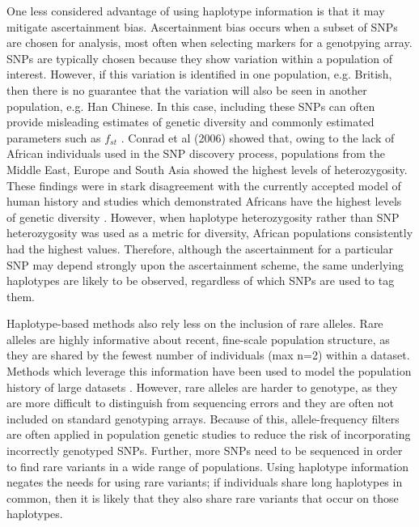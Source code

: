 One less considered advantage of using haplotype information is that it may mitigate ascertainment bias. Ascertainment bias occurs when a subset of SNPs are chosen for analysis, most often when selecting markers for a genotpying array. SNPs are typically chosen because they show variation within a population of interest. However, if this variation is identified in one population, e.g. British, then there is no guarantee that the variation will also be seen in another population, e.g. Han Chinese. In this case, including these SNPs can often provide misleading estimates of genetic diversity and commonly estimated parameters such as $f_{st}$ \cite{BergstromHGDP}. Conrad et al (2006) showed that, owing to the lack of African individuals used in the SNP discovery process, populations from the Middle East, Europe and South Asia showed the highest levels of heterozygosity. These findings were in stark disagreement with the currently accepted model of human history and studies which demonstrated Africans have the highest levels of genetic diversity \cite{cann1987mitochondrial, rosenberg2002genetic, ramachandran2005support, bowcock1994high, hellenthal2008inferring}. However, when haplotype heterozygosity rather than SNP heterozygosity was used as a metric for diversity, African populations consistently had the highest values. Therefore, although the ascertainment for a particular SNP may depend strongly upon the ascertainment scheme, the same underlying haplotypes are likely to be observed, regardless of which SNPs are used to tag them. 

Haplotype-based methods also rely less on the inclusion of rare alleles. Rare alleles are highly informative about recent, fine-scale population structure, as they are shared by the fewest number of individuals (max n=2) within a dataset. Methods which leverage this information have been used to model the population history of large datasets \cite{schiffels2016iron, gravel2011demographic, o2015rare}. However, rare alleles are harder to genotype, as they are more difficult to distinguish from sequencing errors and they are often not included on standard genotyping arrays. Because of this, allele-frequency filters are often applied in population genetic studies to reduce the risk of incorporating incorrectly genotyped SNPs. Further, more SNPs need to be sequenced in order to find rare variants in a wide range of populations. Using haplotype information negates the needs for using rare variants; if individuals share long haplotypes in common, then it is likely that they also share rare variants that occur on those haplotypes. 

